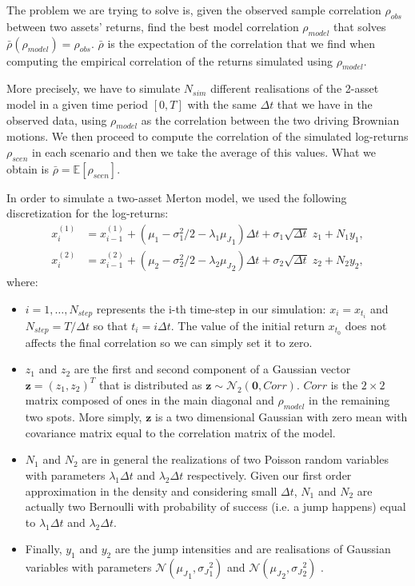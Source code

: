 The problem we are trying to solve is, given the observed sample correlation $\rho_{obs}$ between two assets' returns, find the best model correlation $\rho_{model}$ that solves $\bar{\rho}(\rho_{model}) = \rho_{obs}$.
$\bar{\rho}$ is the expectation of the correlation that we find when computing the  empirical correlation of the returns simulated using $\rho_{model}$.

More precisely, we have to simulate $N_{sim}$ different realisations of the 2-asset model in a given time period $[0, T]$ with the same $\Delta t$ that we have in the observed data, using $\rho_{model}$ as the correlation between the two driving Brownian motions. We then proceed to compute the correlation of the simulated log-returns $\rho_{scen}$ in each scenario and then we take the average of this values. What we obtain is $\bar{\rho} = \mathbb{E}[\rho_{scen}] $.

In order to simulate a two-asset Merton model, we used the following discretization for the log-returns:
\begin{subequations}
	\label{eq:merton_discretization}
	\begin{align}
	x_i^{(1)} &= x_{i-1}^{(1)} + (\mu_1 - \sigma_1^2/2 -\lambda_1 {\mu_J}_1) \Delta t + \sigma_1 \sqrt{\Delta t} \;  z_1 + N_1 {y}_1 ,\\
	x_i^{(2)} &= x_{i-1}^{(2)} + (\mu_2 - \sigma_2^2/2 -\lambda_2 {\mu_J}_2) \Delta t + \sigma_2 \sqrt{\Delta t} \; z_2 + N_2 {y}_2 ,
	\end{align}
\end{subequations} 
where:
\begin{itemize}
	\item $i = 1, \dots , N_{step}$ represents the i-th time-step in our simulation: $x_i = x_{t_i}$ and $N_{step} = T / \Delta t$ so that $t_i = i \Delta t$. The value of the initial return $x_{t_0}$ does not affects the final correlation so we can simply set it to zero.
	\item $z_1$ and $z_2$ are the first and second component of a Gaussian vector $\mathbf{z} = (z_1,z_2)^T$ that is distributed as $\mathbf{z} \sim \mathcal{N}_2(\mathbf{0}, Corr)$. $Corr$ is the $2 \times 2$ matrix composed of ones in the main diagonal and $\rho_{model}$ in the remaining two spots. 
	More simply, $\mathbf{z}$ is a two dimensional Gaussian with zero mean with covariance matrix equal to the correlation matrix of the model.
	\item $N_1$ and $N_2$ are in general the realizations of two Poisson random variables with parameters $\lambda_1 \Delta t$ and $\lambda_2 \Delta t$ respectively. Given our first order approximation in the density and considering small $\Delta t$,  $N_1$ and $N_2$ are actually two Bernoulli with probability of success (i.e. a jump happens) equal to $\lambda_1 \Delta t$ and $\lambda_2 \Delta t$.
	\item Finally, $y_1$ and $y_2$ are the jump intensities and are realisations of Gaussian variables with parameters $\mathcal{N}({\mu_J}_1, {\sigma_J}_1^2)$ and $\mathcal{N}({\mu_J}_2, {\sigma_J}_2^2)$ . 
\end{itemize}

